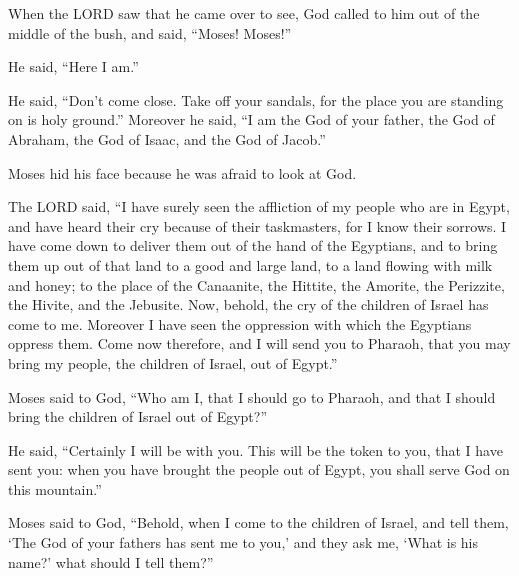  When the LORD saw that he came over to see, God called to
him out of the middle of the bush, and said, ``Moses! Moses!''

He said, ``Here I am.''

 He said, ``Don't come close. Take off your sandals, for the
place you are standing on is holy ground.''  Moreover he
said, ``I am the God of your father, the God of Abraham, the God of
Isaac, and the God of Jacob.''

Moses hid his face because he was afraid to look at God.

 The LORD said, ``I have surely seen the affliction of my
people who are in Egypt, and have heard their cry because of their
taskmasters, for I know their sorrows.  I have come down to
deliver them out of the hand of the Egyptians, and to bring them up out
of that land to a good and large land, to a land flowing with milk and
honey; to the place of the Canaanite, the Hittite, the Amorite, the
Perizzite, the Hivite, and the Jebusite.  Now, behold, the
cry of the children of Israel has come to me. Moreover I have seen the
oppression with which the Egyptians oppress them.  Come now
therefore, and I will send you to Pharaoh, that you may bring my people,
the children of Israel, out of Egypt.''

 Moses said to God, ``Who am I, that I should go to
Pharaoh, and that I should bring the children of Israel out of Egypt?''

 He said, ``Certainly I will be with you. This will be the
token to you, that I have sent you: when you have brought the people out
of Egypt, you shall serve God on this mountain.''

 Moses said to God, ``Behold, when I come to the children
of Israel, and tell them, `The God of your fathers has sent me to you,'
and they ask me, `What is his name?' what should I tell them?''

